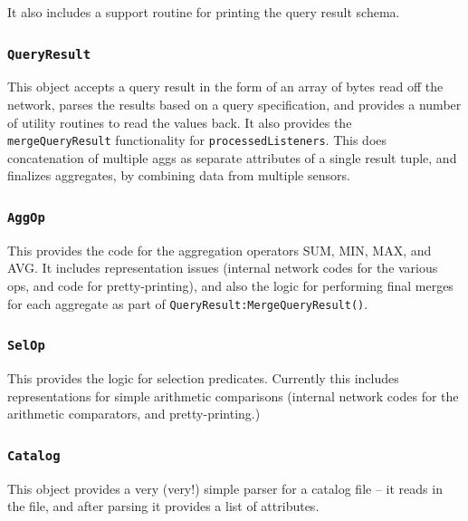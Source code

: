 \documentclass[11pt]{article}
\begin{document}
   It also includes a support routine for printing the query result
   schema.

\subsubsection{\tt QueryResult}
\label{sec:tinydbqueryresult}
This object accepts a query result in the
    form of an array of bytes read off the network, parses the results
    based on a query specification, and provides a number of utility
    routines to read the values back.  It also provides the {\tt
    mergeQueryResult} functionality for {\tt processedListeners}.
    This does concatenation of multiple aggs as separate attributes of
    a single result tuple, and finalizes aggregates, by
    combining data from multiple sensors.

\subsubsection{\tt AggOp} 
\label{sec:tinydbaggop}

This provides the code for the aggregation
  operators SUM, MIN, MAX, and AVG.  It includes representation
  issues (internal network codes for the various ops, and code for
  pretty-printing), and also the logic for performing final merges for
  each aggregate as part of {\tt QueryResult:MergeQueryResult()}.

\subsubsection{\tt SelOp}  
\label{sec:tinydbselop}
This provides the logic for selection predicates.
  Currently this includes representations for simple arithmetic
  comparisons (internal network codes for the arithmetic comparators,
  and pretty-printing.)

\subsubsection{\tt Catalog}  
\label{sec:tinydbcatalog}
This object provides a very (very!) simple parser
  for a catalog file -- it reads in the file, and after parsing it
  provides a list of attributes.
\end{document}

